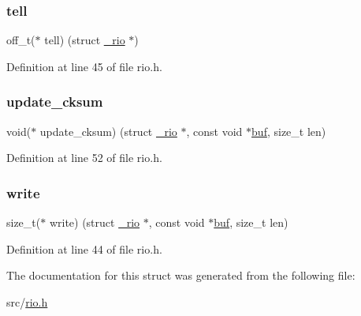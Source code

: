\subsubsection{\texorpdfstring{tell}{tell}}
{\footnotesize\ttfamily off\+\_\+t($\ast$ tell) (struct \hyperlink{struct__rio}{\+\_\+rio} $\ast$)}



Definition at line 45 of file rio.\+h.

\mbox{\label{struct__rio_a0d11c9195df688114fd7e3d39b06c269}} 
\subsubsection{\texorpdfstring{update\+\_\+cksum}{update\_cksum}}
{\footnotesize\ttfamily void($\ast$ update\+\_\+cksum) (struct \hyperlink{struct__rio}{\+\_\+rio} $\ast$, const void $\ast$\hyperlink{struct__rio_ae8dd93102163eea99d3d0949d1974628}{buf}, size\+\_\+t len)}



Definition at line 52 of file rio.\+h.

\mbox{\label{struct__rio_aa7c29e99e2a05a47c569af36fa61272c}} 
\subsubsection{\texorpdfstring{write}{write}}
{\footnotesize\ttfamily size\+\_\+t($\ast$ write) (struct \hyperlink{struct__rio}{\+\_\+rio} $\ast$, const void $\ast$\hyperlink{struct__rio_ae8dd93102163eea99d3d0949d1974628}{buf}, size\+\_\+t len)}



Definition at line 44 of file rio.\+h.



The documentation for this struct was generated from the following file\+:\begin{DoxyCompactItemize}
\item 
src/\hyperlink{rio_8h}{rio.\+h}\end{DoxyCompactItemize}

